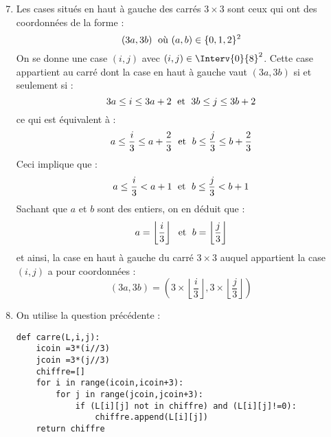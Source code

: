\documentclass[a4paper,9pt]{report}
\begin{document}
\begin{enumerate}
\setcounter{enumi}{6}
\item Les cases situés en haut à gauche des carrés $3 \times 3$ sont ceux qui ont des coordonnées de la forme :
$$ (3a,3b) \; \hbox{ où } (a,b) \in \lbrace 0,1,2 \rbrace^2$$
On se donne une case $(i,j)$ avec $(i,j) \in \Interv{0}{8}^2$. Cette case appartient au carré dont la case en haut à gauche vaut $(3a,3b)$ si et seulement si :
$$ 3a \leq i \leq 3a+2 \; \hbox{ et } \; 3b \leq j \leq 3b+2$$
ce qui est équivalent à :
$$ a \leq \dfrac{i}{3} \leq a + \dfrac{2}{3} \; \hbox{ et } \; b \leq \dfrac{j}{3} \leq b + \dfrac{2}{3}$$
Ceci implique que :
$$  a \leq \dfrac{i}{3} <a+1 \; \hbox{ et } \; b \leq \dfrac{j}{3}<b+1$$
Sachant que $a$ et $b$ sont des entiers, on en déduit que :
$$ a = \left\lfloor \dfrac{i}{3} \right\rfloor \; \hbox{ et } \; b = \left\lfloor \dfrac{j}{3} \right\rfloor$$
et ainsi, la case en haut à gauche du carré $3 \times 3$ auquel appartient la case $(i,j)$ a pour coordonnées :
$$  (3a,3b)= \left( 3 \times \left\lfloor \dfrac{i}{3} \right\rfloor , 3 \times \left\lfloor \dfrac{j}{3} \right\rfloor \right)$$
\item On utilise la question précédente :

\begin{center}
\begin{minipage}{0.7\textwidth}
		
\begin{lstlisting}
def carre(L,i,j):
    icoin =3*(i//3)
    jcoin =3*(j//3)
    chiffre=[]
    for i in range(icoin,icoin+3):
        for j in range(jcoin,jcoin+3):
            if (L[i][j] not in chiffre) and (L[i][j]!=0):
                chiffre.append(L[i][j]) 
    return chiffre
\end{lstlisting}

\end{minipage}
\end{center}
\end{enumerate}
\end{document}
